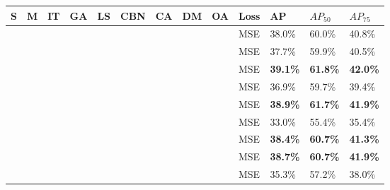 \begin{table}[]
	\centering
	\begin{tabular}{@{}lllllllllllll@{}}
		\toprule
		\textbf{S} & \textbf{M} & \textbf{IT} & \textbf{GA} & \textbf{LS} & \textbf{CBN} & \textbf{CA} & \textbf{DM} & \textbf{OA} & \textbf{Loss} & \textbf{AP}     & \textbf{$AP_50$}  & \textbf{$AP_75$}  \\ \midrule
		           &            &             &             &             &              &             &             &             & MSE           & 38.0\%          & 60.0\%          & 40.8\%          \\ \midrule
			   \checkmark &            &             &             &             &              &             &             &             & MSE           & 37.7\%          & 59.9\%          & 40.5\%          \\
			              & \checkmark &             &             &             &              &             &             &             & MSE           & \textbf{39.1\%} & \textbf{61.8\%} & \textbf{42.0\%} \\
				                 &            & \checkmark  &             &             &              &             &             &             & MSE           & 36.9\%          & 59.7\%          & 39.4\%          \\
						            &            &             & \checkmark  &             &              &             &             &             & MSE           & \textbf{38.9\%} & \textbf{61.7\%} & \textbf{41.9\%} \\
							               &            &             &             & \checkmark  &              &             &             &             & MSE           & 33.0\%          & 55.4\%          & 35.4\%          \\
								                  &            &             &             &             & \checkmark   &             &             &             & MSE           & \textbf{38.4\%} & \textbf{60.7\%} & \textbf{41.3\%} \\
										             &            &             &             &             &              & \checkmark  &             &             & MSE           & \textbf{38.7\%} & \textbf{60.7\%} & \textbf{41.9\%} \\
											                &            &             &             &             &              &             & \checkmark  &             & MSE           & 35.3\%          & 57.2\%          & 38.0\%          \\

\end{tabular}
\end{table}
